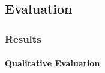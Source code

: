 \subsection*{Evaluation}
\begin{frame}[t]
    \frametitle{Results}    
    \framesubtitle{Qualitative Evaluation}
    \begin{center}
            
    \end{center}
\end{frame}